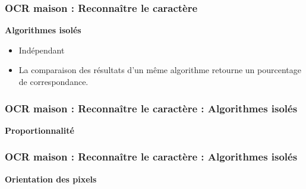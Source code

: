 \documentclass[xcolor=dvipsnames]{beamer}
\begin{document}
\begin{frame}
  \frametitle{OCR maison : Reconnaître le caractère}

  \begin{center}\begin{alertblock}{}
    \begin{center}\textbf{\Large Algorithmes isolés}\end{center}
  \end{alertblock}\end{center}
  
  \begin{itemize}[<+->]
   \item Indépendant
   \item La comparaison des résultats d'un même algorithme retourne un pourcentage de correspondance.
  \end{itemize}
\end{frame}


\begin{frame}
  \frametitle{OCR maison : Reconnaître le caractère : Algorithmes isolés}

  \begin{center}\begin{alertblock}{}
    \begin{center}\textbf{\Large Proportionnalité}\end{center}
  \end{alertblock}\end{center}

  
\end{frame}


\begin{frame}
  \frametitle{OCR maison : Reconnaître le caractère : Algorithmes isolés}

  \begin{center}\begin{alertblock}{}
    \begin{center}\textbf{\Large Orientation des pixels}\end{center}
  \end{alertblock}\end{center}

\end{frame}
\end{document}

